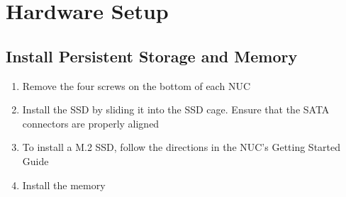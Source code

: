\documentclass{article}
\begin{document}
\section{Hardware Setup}
    \subsection{Install Persistent Storage and Memory}
    \begin{enumerate}
        \item Remove the four screws on the bottom of each NUC
        \item Install the SSD by sliding it into the SSD cage.  Ensure that the SATA
            connectors are properly aligned
        \item To install a M.2 SSD, follow the directions in the NUC's Getting Started
            Guide
        \item Install the memory
    \end{enumerate}
\end{document}
